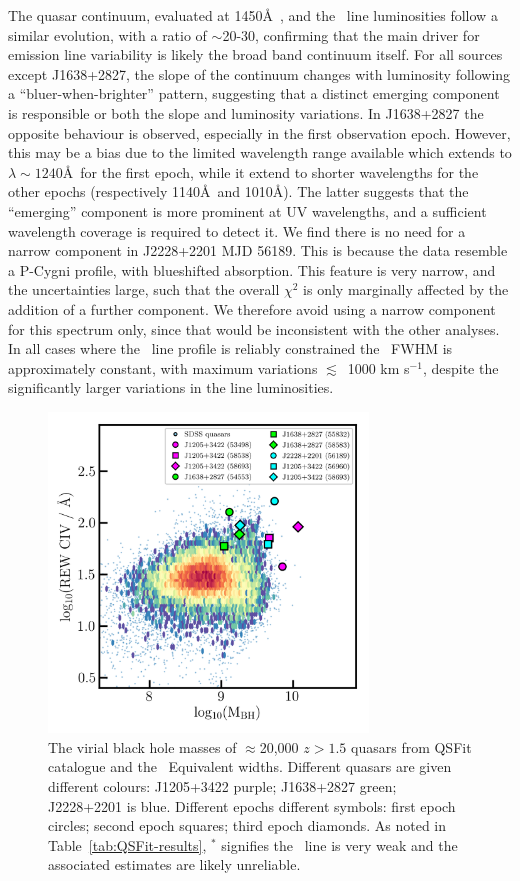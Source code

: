 \documentclass[fleqn,usenatbib]{mnras}
\begin{document}
The quasar continuum, evaluated at 1450\AA\ , and the \civ\ line
luminosities follow a similar evolution, with a ratio of $\sim$20-30,
confirming that the main driver for emission line variability is
likely the broad band continuum itself.  For all sources except
J1638+2827, the slope of the continuum changes with luminosity
following a ``bluer-when-brighter'' pattern, suggesting that a
distinct emerging component is responsible or both the slope and
luminosity variations.  In J1638+2827 the opposite behaviour is
observed, especially in the first observation epoch.  However, this
may be a bias due to the limited wavelength range available which
extends to $\lambda \sim 1240$\AA\ for the first epoch, while it extend
to shorter wavelengths for the other epochs (respectively 1140\AA\ and
1010\AA).  The latter suggests that the ``emerging'' component is more
prominent at UV wavelengths, and a sufficient wavelength coverage is
required to detect it. We find there is no need for a narrow component
in J2228+2201 MJD 56189.  This is because the data resemble a P-Cygni
profile, with blueshifted absorption. This feature is very narrow, and
the uncertainties large, such that the overall $\chi^{2}$ is only
marginally affected by the addition of a further component. We
therefore avoid using a narrow component for this spectrum only, since
that would be inconsistent with the other analyses.
In all cases where the \civ\ line profile is reliably constrained the
\civ\ FWHM is approximately constant, with maximum variations
$\lesssim$~1000 km s$^{-1}$, despite the significantly larger
variations in the line luminosities.


\begin{figure}
  \centering
  \includegraphics[width=8.5cm, trim=0.2cm 0.2cm 0.0cm 0.2cm, clip]
  {figures/CIV_CLQs_MBHvsREW_QSFit20K.png}
   \vspace{-12pt}
   \caption[]{The virial black hole masses of $\approx$20,000 $z>1.5$ quasars
     from QSFit catalogue \citep{Calderone2017} and the \civ\
     Equivalent widths.  Different quasars are given different colours:
     J1205+3422 purple; J1638+2827 green; J2228+2201 is blue.  Different
     epochs different symbols: first epoch circles; second epoch squares;
     third epoch diamonds.  As noted in Table~\ref{tab:QSFit-results},
     $^{*}$ signifies the \civ\ line is very weak and the associated
     estimates are likely unreliable.}
   \label{fig:CIV_MBHvsREW}
\end{figure}
\end{document}
